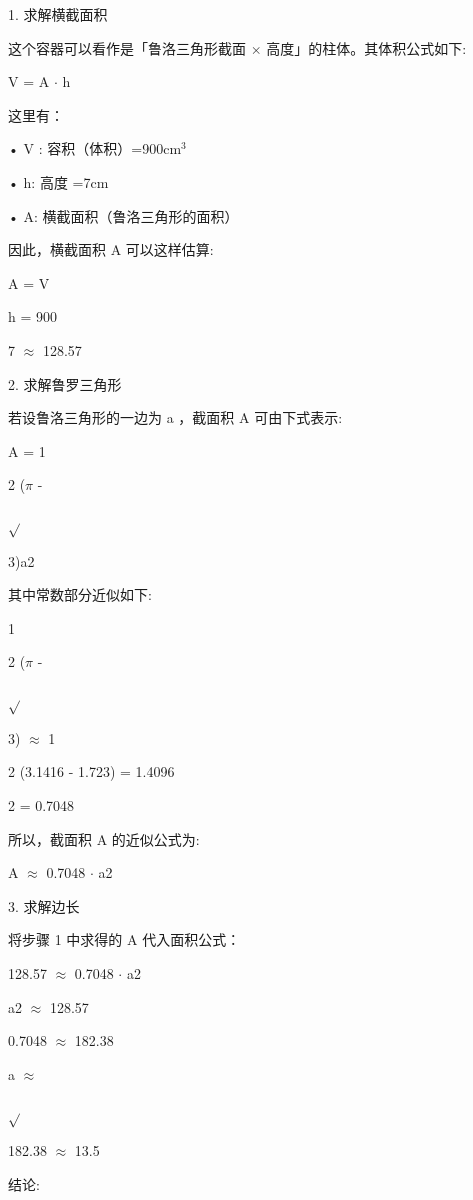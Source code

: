 1. 求解横截面积\par
这个容器可以看作是「鲁洛三角形截面 $\times$ 高度」的柱体。其体积公式如下:\par
V = A $\cdot$ h\par
这里有：\par
• V : 容积（体积）=900cm$^{3}$\par
• h: 高度 =7cm\par
• A: 横截面积（鲁洛三角形的面积）\par
因此，横截面积 A 可以这样估算:\par
A = V\par
h = 900\par
7 $\approx$ 128.57\par
2. 求解鲁罗三角形\par
若设鲁洛三角形的一边为 a ，截面积 A 可由下式表示:\par
A = 1\par
2 ($\pi$ -\par
$\sqrt{}$\par
3)a2\par
其中常数部分近似如下:\par
1\par
2 ($\pi$ -\par
$\sqrt{}$\par
3) $\approx$ 1\par
2 (3.1416 - 1.723) = 1.4096\par
2 = 0.7048\par
所以，截面积 A 的近似公式为:\par
A $\approx$ 0.7048 $\cdot$ a2\par
3. 求解边长\par
将步骤 1 中求得的 A 代入面积公式：\par
128.57 $\approx$ 0.7048 $\cdot$ a2\par
a2 $\approx$ 128.57\par
0.7048 $\approx$ 182.38\par
a $\approx$\par
$\sqrt{}$\par
182.38 $\approx$ 13.5\par
结论:\par

